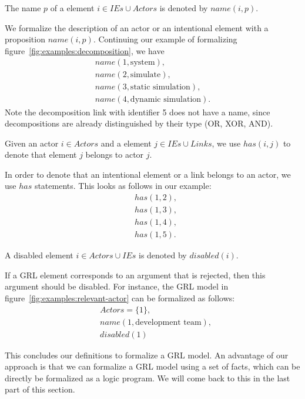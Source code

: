 \begin{definition}
The name $p$ of a element $i\in IEs\cup Actors$ is denoted by $name(i,p)$.
\end{definition}

\rationale{} We formalize the description of an actor or an intentional element with a proposition $name(i,p)$. Continuing our example of formalizing figure~\ref{fig:examples:decomposition}, we have 
\begin{align*}
&name(1,\text{system}),&\\
&name(2,\text{simulate}),&\\
&name(3,\text{static\ simulation}),&\\
&name(4, \text{dynamic simulation}).&
\end{align*}
Note the decomposition link with identifier 5 does not have a name, since decompositions are already distinguished by their type (OR, XOR, AND).

\begin{definition}
Given an actor $i\in Actors$ and a element $j\in IEs\cup Links$, we use $has(i,j)$ to denote that element $j$ belongs to actor $j$.
\end{definition}

\rationale{} In order to denote that an intentional element or a link belongs to an actor, we use $has$ statements. This looks as follows in our example:
\begin{align*}
&has(1, 2),\\
&has(1, 3),\\
&has(1, 4),\\
&has(1, 5).
\end{align*}

\begin{definition}
A disabled element $i\in Actors\cup IEs$ is denoted by $disabled(i)$.
\end{definition}

\rationale{} If a GRL element corresponds to an argument that is rejected, then this argument should be disabled. For instance, the GRL model in figure~\ref{fig:examples:relevant-actor} can be formalized as follows:
\begin{align*}
&Actors = \{1\},\\
&name(1, \text{development team}),\\
&disabled(1)
\end{align*}

This concludes our definitions to formalize a GRL model. An advantage of our approach is that we can formalize a GRL model using a set of facts, which can be directly be formalized as a logic program. We will come back to this in the last part of this section.

